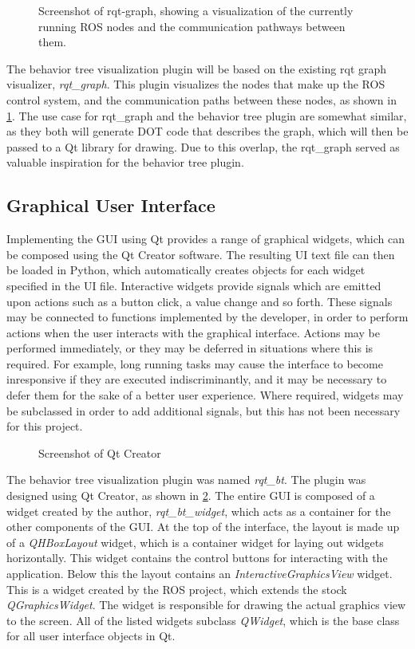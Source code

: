 \documentclass[\rootfolder/main.tex]{subfiles}
\begin{document}
\begin{figure}[ht]
    \caption{Screenshot of rqt-graph, showing a visualization of the currently running ROS nodes and the communication pathways between them.}
    \label{fig:rqt-graph}
\end{figure}

The behavior tree visualization plugin will be based on the existing rqt graph visualizer, \emph{rqt\_graph}.
This plugin visualizes the nodes that make up the ROS control system, and the communication paths between these nodes, as shown in \cref{fig:rqt-graph}.
The use case for rqt\_graph and the behavior tree plugin are somewhat similar, as they both will generate DOT code that describes the graph, which will then be passed to a Qt library for drawing.
Due to this overlap, the rqt\_graph served as valuable inspiration for the behavior tree plugin.

\subsection{Graphical User Interface}

Implementing the GUI using Qt provides a range of graphical widgets, which can be composed using the Qt Creator software.
The resulting UI text file can then be loaded in Python, which automatically creates objects for each widget specified in the UI file.
Interactive widgets provide signals which are emitted upon actions such as a button click, a value change and so forth.
These signals may be connected to functions implemented by the developer, in order to perform actions when the user interacts with the graphical interface.
Actions may be performed immediately, or they may be deferred in situations where this is required.
For example, long running tasks may cause the interface to become inresponsive if they are executed indiscriminantly, and it may be necessary to defer them for the sake of a better user experience.
Where required, widgets may be subclassed in order to add additional signals, but this has not been necessary for this project.

\begin{figure}[ht]
    \caption{Screenshot of Qt Creator}
    \label{fig:qt-creator}
\end{figure}

The behavior tree visualization plugin was named \emph{rqt\_bt}.
The plugin was designed using Qt Creator, as shown in \cref{fig:qt-creator}.
The entire GUI is composed of a widget created by the author, \emph{rqt\_bt\_widget}, which acts as a container for the other components of the GUI.
At the top of the interface, the layout is made up of a \emph{QHBoxLayout} widget, which is a container widget for laying out widgets horizontally.
This widget contains the control buttons for interacting with the application.
Below this the layout contains an \emph{InteractiveGraphicsView} widget.
This is a widget created by the ROS project, which extends the stock \emph{QGraphicsWidget}.
The widget is responsible for drawing the actual graphics view to the screen.
All of the listed widgets subclass \emph{QWidget}, which is the base class for all user interface objects in Qt.
\end{document}
